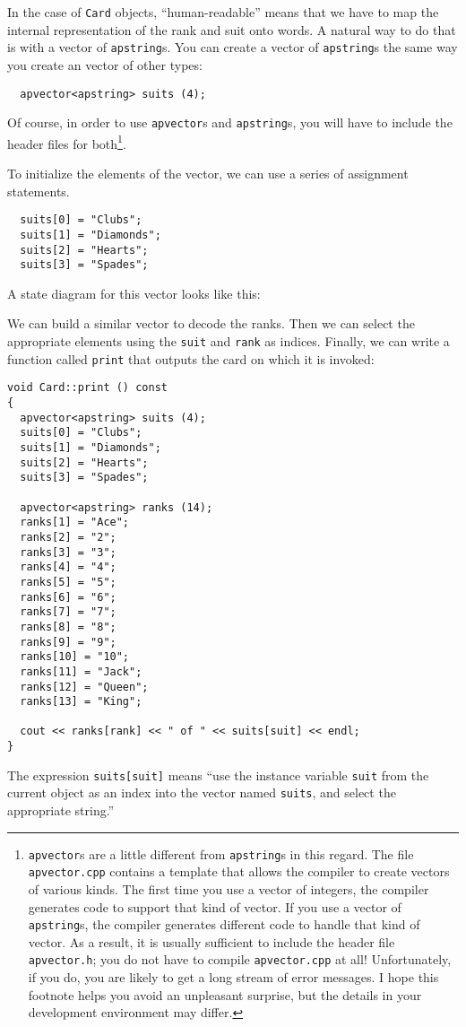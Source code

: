 
In the case of {\tt Card} objects, ``human-readable'' means that we
have to map the internal representation of the rank and suit onto
words.  A natural way to do that is with a vector of {\tt apstring}s.
You can create a vector of {\tt apstring}s the same way you create an
vector of other types:

\begin{verbatim}
  apvector<apstring> suits (4);
\end{verbatim}
%
Of course, in order to use {\tt apvector}s and {\tt apstring}s, you
will have to include the header files for both\footnote{{\tt apvector}s
are a little different from {\tt apstring}s in this regard.
The file {\tt apvector.cpp} contains a template that allows the
compiler to create vectors of various kinds.  The first time you
use a vector of integers, the compiler generates code
to support that kind of vector.  If you use a vector of {\tt apstring}s,
the compiler generates different code to handle that kind of
vector.  As a result, it is usually sufficient to include the
header file {\tt apvector.h}; you do not have to compile
{\tt apvector.cpp} at all!  Unfortunately, if you do, you are
likely to get a long stream of error messages.  I hope this
footnote helps you avoid an unpleasant surprise, but the details
in your development environment may differ.}.

To initialize the elements of the vector, we can use a series of
assignment statements.

\begin{verbatim}
  suits[0] = "Clubs";
  suits[1] = "Diamonds";
  suits[2] = "Hearts";
  suits[3] = "Spades";
\end{verbatim}
%
A state diagram for this vector looks like this:


\vspace{0.1in}
\centerline{}
\vspace{0.1in}

We can build a similar vector to decode the ranks.
Then we can select the appropriate elements
using the {\tt suit} and {\tt rank} as indices.  Finally, we can
write a function called {\tt print} that outputs the card on which
it is invoked:

\begin{verbatim}
void Card::print () const
{
  apvector<apstring> suits (4);
  suits[0] = "Clubs";
  suits[1] = "Diamonds";
  suits[2] = "Hearts";
  suits[3] = "Spades";

  apvector<apstring> ranks (14);
  ranks[1] = "Ace";
  ranks[2] = "2";
  ranks[3] = "3";
  ranks[4] = "4";
  ranks[5] = "5";
  ranks[6] = "6";
  ranks[7] = "7";
  ranks[8] = "8";
  ranks[9] = "9";
  ranks[10] = "10";
  ranks[11] = "Jack";
  ranks[12] = "Queen";
  ranks[13] = "King";

  cout << ranks[rank] << " of " << suits[suit] << endl;
}
\end{verbatim}
%
The expression {\tt suits[suit]} means ``use the instance variable
{\tt suit} from the current object as an index into the vector named
{\tt suits}, and select the appropriate string.''

